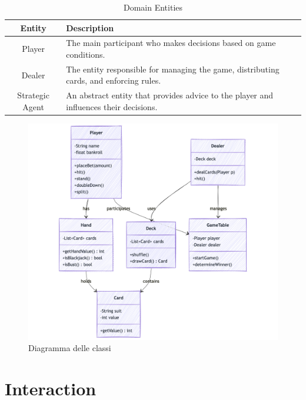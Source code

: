 \begin{table}[h]
    \centering
    \renewcommand{\arraystretch}{1.3}
    \begin{tabular}{|c|p{8cm}|}
        \hline
        \textbf{Entity} & \textbf{Description} \\
        \hline
        Player & The main participant who makes decisions based on game conditions. \\
        \hline
        Dealer & The entity responsible for managing the game, distributing cards, and enforcing rules. \\
        \hline
        Strategic Agent & An abstract entity that provides advice to the player and influences their decisions. \\
        \hline
    \end{tabular}
    \caption{Domain Entities}
    \label{tab:domain_entities}
\end{table}

\begin{figure}[!htb]
    \centering
    \includegraphics[scale=0.55]{report/img/classDiagram.png}
    \caption{Diagramma delle classi}
    \label{fig:classDiagram}
\end{figure}

\section{Interaction}

